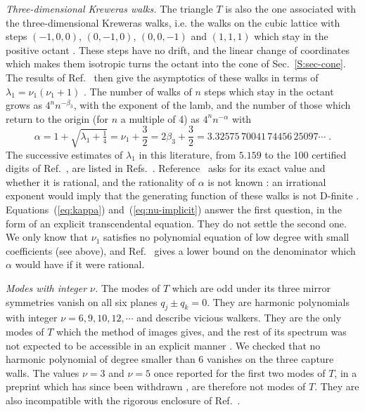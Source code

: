 \emph{Three-dimensional Kreweras walks.} The triangle $T$ is also the one associated with the three-dimensional Kreweras walks, i.e. the walks on the cubic lattice with steps $(-1,0,0)$, $(0,-1,0)$, $(0,0,-1)$ and $(1,1,1)$ which stay in the positive octant \cite{BBKM16,BPRT20}. These steps have no drift, and the linear change of coordinates which makes them isotropic turns the octant into the cone of Sec.~\ref{S:sec-cone}. The results of Ref.~\cite{DW15} then give the asymptotics of these walks in terms of $\lambda_1 = \nu_1 (\nu_1 + 1)$ \cite{BPRT20}. The number of walks of $n$ steps which stay in the octant grows as $4^n n^{-\beta_3}$, with the exponent of the lamb, and the number of those which return to the origin (for $n$ a multiple of 4) as $4^n n^{-\alpha}$ with
\begin{equation*}
    \alpha = 1 + \sqrt{\lambda_1 + \tfrac{1}{4}} = \nu_1 + \frac{3}{2} = 2 \beta_3 + \frac{3}{2} = 3.32575\,70041\,74456\,25097 \cdots \;.
\end{equation*}
The successive estimates of $\lambda_1$ in this literature, from $5.159$ \cite{RT09} to the 100 certified digits of Ref.~\cite{DS20}, are listed in Refs.~\cite{BPRT20,DS20}. Reference~\cite{BPRT20} asks for its exact value and whether it is rational, and the rationality of $\alpha$ is not known \cite{HJR24}: an irrational exponent would imply that the generating function of these walks is not D-finite \cite{BPRT20,DS20}. Equations~(\ref{eq:kappa}) and~(\ref{eq:nu-implicit}) answer the first question, in the form of an explicit transcendental equation. They do not settle the second one. We only know that $\nu_1$ satisfies no polynomial equation of low degree with small coefficients (see above), and Ref.~\cite{DS20} gives a lower bound on the denominator which $\alpha$ would have if it were rational.

\emph{Modes with integer $\nu$.} The modes of $T$ which are odd under its three mirror symmetries vanish on all six planes $q_j \pm q_k = 0$. They are harmonic polynomials with integer $\nu = 6, 9, 10, 12, \cdots$ \cite{SS01} and describe vicious walkers. They are the only modes of $T$ which the method of images gives, and the rest of its spectrum was not expected to be accessible in an explicit manner \cite{HJR24}. We checked that no harmonic polynomial of degree smaller than 6 vanishes on the three capture walls. The values $\nu = 3$ and $\nu = 5$ once reported for the first two modes of $T$, in a preprint which has since been withdrawn \cite{Tao21}, are therefore not modes of $T$. They are also incompatible with the rigorous enclosure of Ref.~\cite{DS20}.

